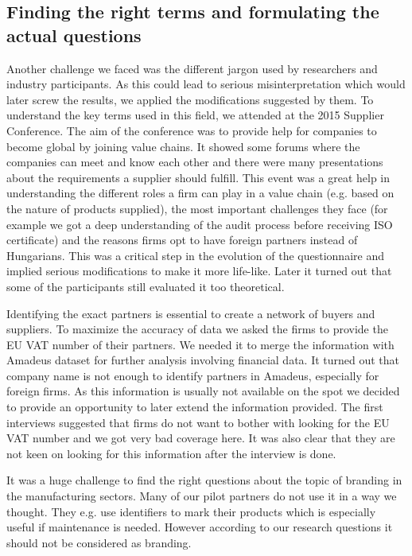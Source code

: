 \documentclass[final, dvipsnames, authoryear,12pt]{elsarticle}
\begin{document}
\subsection{Finding the right terms and formulating the actual questions}

Another challenge we faced was the different jargon used by researchers and industry participants. As this could lead to serious misinterpretation which would later screw the results, we applied the modifications suggested by them. To understand the key terms used in this field, we attended at the 2015 Supplier Conference. The aim of the conference was to provide help for companies to become global by joining value chains. It showed some forums where the companies can meet and know each other and there were many presentations about the requirements a supplier should fulfill. This event was a great help in understanding the different roles a firm can play in a value chain (e.g. based on the nature of products supplied), the most important challenges they face (for example we got a deep understanding of the audit process before receiving ISO certificate) and the reasons firms opt to have foreign partners instead of Hungarians. This was a critical step in the evolution of the questionnaire and implied serious modifications to make it more life-like. Later it turned out that some of the participants still evaluated it too theoretical.

Identifying the exact partners is essential to create a network of buyers and suppliers. To maximize the accuracy of data we asked the firms to provide the EU VAT number of their partners. We needed it to merge the information with Amadeus dataset for further analysis involving financial data. It turned out that company name is not enough to identify partners in Amadeus, especially for foreign firms. As this information is usually not available on the spot we decided to provide an opportunity to later extend the information provided. The first interviews suggested that firms do not want to bother with looking for the EU VAT number and we got very bad coverage here. It was also clear that they are not keen on looking for this information after the interview is done.

It was a huge challenge to find the right questions about the topic of branding in the manufacturing sectors. Many of our pilot partners do not use it in a way we thought. They e.g. use identifiers to mark their products which is especially useful if maintenance is needed. However according to our research questions it should not be considered as branding.
\end{document}
